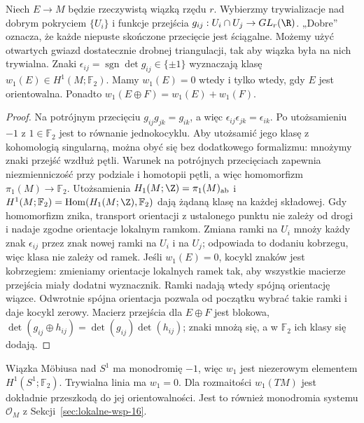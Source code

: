 \begin{stwierdzenie}
\label{prop:w1-orientacja-16}
Niech $E\to M$ będzie
rzeczywistą wiązką
rzędu $r$. Wybierzmy
trywializacje nad dobrym
pokryciem $\{U_i\}$ i
funkcje przejścia
$g_{ij}:U_i\cap U_j\to GL_r(\R)$.
„Dobre” oznacza, że każde niepuste skończone przecięcie
jest ściągalne. Możemy użyć otwartych gwiazd dostatecznie
drobnej triangulacji, tak aby wiązka była na nich trywialna.
Znaki
$\epsilon_{ij}=\operatorname{sgn}
\det g_{ij}\in\{\pm1\}$
wyznaczają klasę
$w_1(E)\in H^1(M;\mathbb F_2)$.
Mamy $w_1(E)=0$
wtedy i tylko wtedy,
gdy $E$ jest orientowalna.
Ponadto
$w_1(E\oplus F)=w_1(E)+w_1(F)$.
\end{stwierdzenie}
\begin{proof}
Na potrójnym przecięciu
$g_{ij}g_{jk}=g_{ik}$,
a więc
$\epsilon_{ij}\epsilon_{jk}
=\epsilon_{ik}$.
Po utożsamieniu $-1$
z $1\in\mathbb F_2$
jest to równanie jednokocyklu. Aby utożsamić jego
klasę z kohomologią singularną, można obyć się
bez dodatkowego formalizmu: mnożymy znaki przejść
wzdłuż pętli. Warunek na potrójnych przecięciach
zapewnia niezmienniczość przy podziale i homotopii
pętli, a więc homomorfizm $\pi_1(M)\to\mathbb F_2$.
Utożsamienia $H_1(M;\Z)=\pi_1(M)_{\mathrm{ab}}$
i $H^1(M;\mathbb F_2)=\operatorname{Hom}(H_1(M;\Z),\mathbb F_2)$
dają żądaną klasę na każdej składowej. Gdy homomorfizm
znika, transport orientacji z ustalonego punktu nie
zależy od drogi i nadaje zgodne orientacje lokalnym ramkom.
Zmiana
ramki na $U_i$ mnoży
każdy znak $\epsilon_{ij}$
przez znak nowej ramki
na $U_i$ i na $U_j$;
odpowiada to dodaniu
kobrzegu, więc klasa
nie zależy od ramek.
Jeśli $w_1(E)=0$,
kocykl znaków jest
kobrzegiem: zmieniamy
orientacje lokalnych
ramek tak, aby wszystkie
macierze przejścia
miały dodatni wyznacznik.
Ramki nadają wtedy
spójną orientację
wiązce. Odwrotnie
spójna orientacja
pozwala od początku
wybrać takie ramki
i daje kocykl zerowy.
Macierz przejścia
dla $E\oplus F$
jest blokowa,
$\det(g_{ij}\oplus h_{ij})
=\det(g_{ij})\det(h_{ij})$;
znaki mnożą się, a
w $\mathbb F_2$
ich klasy się dodają.
\end{proof}

\begin{przyklad}
Wiązka Möbiusa nad $S^1$
ma monodromię $-1$,
więc $w_1$ jest
niezerowym elementem
$H^1(S^1;\mathbb F_2)$.
Trywialna linia ma $w_1=0$.
Dla rozmaitości
$w_1(TM)$ jest dokładnie
przeszkodą do jej
orientowalności.
Jest to również
monodromia systemu
$\mathcal O_M$
z Sekcji~\ref{sec:lokalne-wsp-16}.
\end{przyklad}

